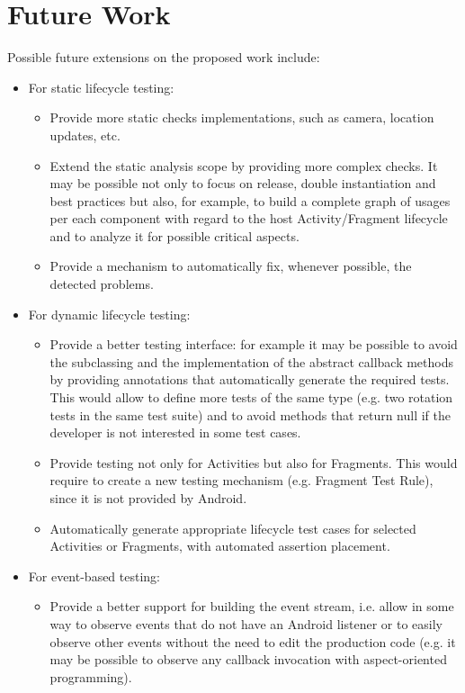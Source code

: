 \documentclass[11pt,a4paper,notitlepage]{article}
\begin{document}
{\section{Future Work}
Possible future extensions on the proposed work include:
\begin{itemize}
	\item For static lifecycle testing:
	\begin{itemize}
		\item Provide more static checks implementations, such as camera, location updates, etc.
		\item Extend the static analysis scope by providing more complex checks. It may be possible not only to focus on release, double instantiation and best practices but also, for example, to build a complete graph of usages per each component with regard to the host Activity/Fragment lifecycle and to analyze it for possible critical aspects.
		\item Provide a mechanism to automatically fix, whenever possible, the detected problems.
	\end{itemize}
	\item For dynamic lifecycle testing:
	\begin{itemize}
		\item Provide a better testing interface: for example it may be possible to avoid the subclassing and the implementation of the abstract callback methods by providing annotations that automatically generate the required tests. This would allow to define more tests of the same type (e.g. two rotation tests in the same test suite) and to avoid methods that return null if the developer is not interested in some test cases.
		\item Provide testing not only for Activities but also for Fragments. This would require to create a new testing mechanism (e.g. Fragment Test Rule), since it is not provided by Android.
		\item Automatically generate appropriate lifecycle test cases for selected Activities or Fragments, with automated assertion placement.
	\end{itemize}
	\item For event-based testing:
	\begin{itemize}
		\item Provide a better support for building the event stream, i.e. allow in some way to observe events that do not have an Android listener or to easily observe other events without the need to edit the production code (e.g. it may be possible to observe any callback invocation with aspect-oriented programming).

\end{itemize}
\end{itemize}}
\end{document}
